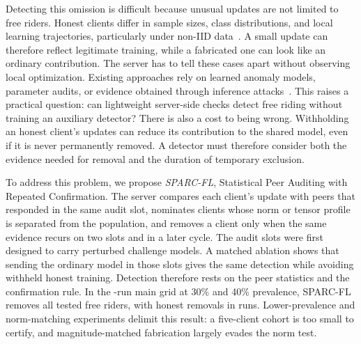 \documentclass[journal]{IEEEtran}
\begin{document}
Detecting this omission is difficult because unusual updates are not limited
to free riders. Honest clients differ in sample sizes, class distributions,
and local learning trajectories, particularly under non-IID
data~\cite{kairouz2021advances}. A small update can therefore reflect
legitimate training, while a fabricated one can look like an ordinary
contribution. The server has to tell these cases apart without observing
local optimization. Existing approaches rely on learned anomaly models,
parameter audits, or evidence obtained through inference
attacks~\cite{lin2019freeriders,wang2024pass,recasens2026frida}. This raises a
practical question: can lightweight server-side checks detect free riding
without training an auxiliary detector? There is also a cost to being wrong.
Withholding an honest client's updates can reduce its contribution to the shared
model, even if it is never permanently removed. A detector must therefore
consider both the evidence needed for removal and the duration of temporary
exclusion.

To address this problem, we propose \emph{SPARC-FL}, Statistical Peer
Auditing with Repeated Confirmation. The server compares each client's
update with peers that responded in the same audit slot, nominates clients
whose norm or tensor profile is separated from the population, and removes
a client only when the same evidence recurs on two slots and in a later
cycle. The audit slots were first designed to carry perturbed challenge
models. A matched ablation shows that sending the ordinary model in those
slots gives the same detection while avoiding withheld honest training.
Detection therefore rests on the peer statistics and the confirmation rule.
In the \ReviewRunCount{}-run main grid at 30\% and 40\% prevalence,
SPARC-FL removes all tested free riders, with \MultiFP{} honest removals
in \ReviewAffectedRuns{} runs. Lower-prevalence and norm-matching
experiments delimit this result: a five-client cohort is too small to
certify, and magnitude-matched fabrication largely evades the norm test.
\end{document}
